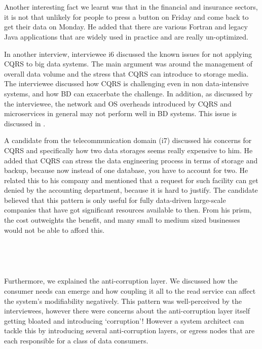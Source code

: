 \documentclass{bmcart}
\begin{document}
\,

\setlength{\fboxsep}{0.7em}
\noindent{}

\,

Another interesting fact we learnt was that in the financial and insurance sectors, it is not that unlikely for people to press a button on Friday and come back to get their data on Monday. He added that there are various Fortran and legacy Java applications that are widely used in practice and are really un-optimized.


In another interview, interviewee i6 discussed the known issues for not applying CQRS to big data systems. The main argument was around the management of overall data volume and the stress that CQRS can introduce to storage media. The interviewee discussed how CQRS is challenging even in non data-intensive systems, and how BD can exacerbate the challenge. In addition, as discussed by the interviewee, the network and OS overheads introduced by CQRS and microservices in general  may not perform well in BD systems. This issue is discussed in \cite{sriraman2018mu}.

A candidate from the telecommunication domain (i7) discussed his concerns for CQRS and specifically how two data storages seems really expensive to him. He added that CQRS can stress the data engineering process in terms of storage and backup, because now instead of one database, you have to account for two. He related this to his company and mentioned that a request for such facility can get denied by the accounting department, because it is hard to justify. The candidate believed that this pattern is only useful for fully data-driven large-scale companies that have got significant resources available to then. From his prism, the cost outweights the benefit, and many small to medium sized businesses would not be able to afford this.

\,

\setlength{\fboxsep}{0.7em}
\noindent{}

\,

Furthermore, we explained the anti-corruption layer. We discussed how the consumer needs can emerge and how coupling it all to the read service can affect the system's modifiability negatively. This pattern was well-perceived by the interviewees, however there were concerns about the anti-corruption layer itself getting bloated and introducing `corruption'! However a system architect can tackle this by introducing several anti-corruption layers, or egress nodes that are each responsible for a class of data consumers. 
\end{document}
